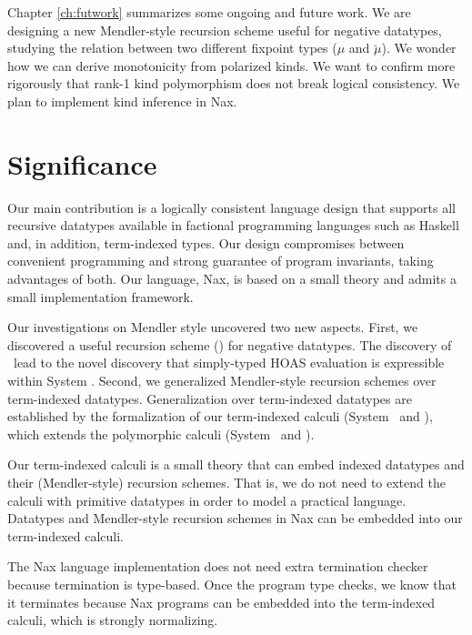 Chapter \ref{ch:futwork} summarizes some ongoing and future work.
We are designing a new Mendler-style recursion scheme useful
for negative datatypes, studying the relation between two different
fixpoint types ($\mu$ and $\breve\mu$). We wonder how we can derive
monotonicity from polarized kinds. We want to confirm more rigorously
that rank-1 kind polymorphism does not break logical consistency.
We plan to implement kind inference in Nax.

\section{Significance}\label{sec:concl:sig}
Our main contribution is a logically consistent language design that supports
all recursive datatypes available in factional programming languages such as
Haskell and, in addition, term-indexed types. Our design compromises between
convenient programming and strong guarantee of program invariants, taking
advantages of both. Our language, Nax, is based on a small theory and
admits a small implementation framework.

Our investigations on Mendler style uncovered two new aspects.
First, we discovered a useful recursion scheme (\MsfIt) for negative datatypes.
The discovery of \MsfIt\ lead to the novel discovery that simply-typed HOAS
evaluation is expressible within System \Fw. Second, we generalized
Mendler-style recursion schemes over term-indexed datatypes.
Generalization over term-indexed datatypes are established by
the formalization of our term-indexed calculi (System \Fi\ and \Fixi),
which extends the polymorphic calculi (System \Fw\ and \Fixw).

Our term-indexed calculi is a small theory that can embed indexed datatypes
and their (Mendler-style) recursion schemes. That is, we do not need to extend
the calculi with primitive datatypes in order to model a practical language.
Datatypes and Mendler-style recursion schemes in Nax can be embedded into
our term-indexed calculi.

The Nax language implementation does not need extra termination checker
because termination is type-based. Once the program type checks, we know
that it terminates because Nax programs can be embedded into
the term-indexed calculi, which is strongly normalizing.

